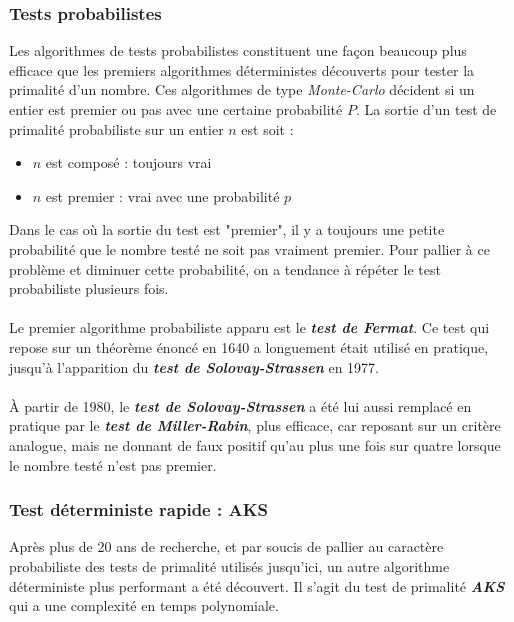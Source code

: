 		\subsubsection*{Tests probabilistes}
			Les algorithmes de tests probabilistes constituent une façon beaucoup plus efficace que les premiers algorithmes déterministes découverts pour tester la primalité d'un nombre. Ces algorithmes de type \textit{Monte-Carlo} décident si un entier est premier ou pas avec une certaine probabilité $P$. La sortie d'un test de primalité probabiliste sur un entier $n$ est soit :
			\begin{itemize}
				\item $n$ est composé : toujours vrai
				\item $n$ est premier : vrai avec une probabilité $p$
			\end{itemize}
			Dans le cas où la sortie du test est "premier", il y a toujours une petite probabilité que le nombre testé ne soit pas vraiment premier. Pour pallier à ce problème et diminuer cette probabilité, on a tendance à répéter le test probabiliste plusieurs fois.
			
			\paragraph{}Le premier algorithme probabiliste apparu est le \textit{\textbf{test de Fermat}}. Ce test qui repose sur un théorème énoncé en 1640 a longuement était utilisé en pratique, jusqu'à l'apparition du \textit{\textbf{test de Solovay-Strassen}} en 1977. 
			
			\paragraph{} À partir de 1980, le \textit{\textbf{test de Solovay-Strassen}} a été lui aussi remplacé en pratique par le \textit{\textbf{test de Miller-Rabin}}, plus efficace, car reposant sur un critère analogue, mais ne donnant de faux positif qu'au plus une fois sur quatre lorsque le nombre testé n'est pas premier.
			
		\subsubsection*{Test déterministe rapide : AKS}
			Après plus de 20 ans de recherche, et par soucis de pallier au caractère probabiliste des tests de primalité utilisés jusqu'ici, un autre algorithme déterministe plus performant a été découvert. Il s'agit du test de primalité \textit{\textbf{AKS}} qui a une complexité en temps polynomiale.
